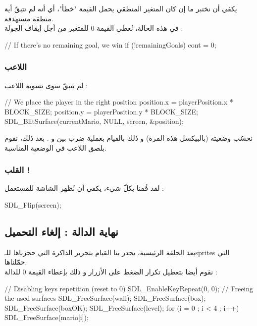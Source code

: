 يكفي أن نختبر ما إن كان المتغير المنطقي يحمل القيمة "خطأ"، أي أنه لم تتبقّ أية منطقة مستهدفة.\\
في هذه الحالة، نُعطي القيمة 0 للمتغير
من أجل إيقاف الجولة :

\begin{Csource}
// If there's no remaining goal, we win
if (!remainingGoals)
	cont = 0;
\end{Csource}

\subsubsection{اللاعب}

لم يتبقّ سوى تسوية اللاعب :

\begin{Csource}
// We place the player in the right position
position.x = playerPosition.x * BLOCK_SIZE;
position.y = playerPosition.y * BLOCK_SIZE;
SDL_BlitSurface(currentMario, NULL, screen, &position);
\end{Csource}

نحسُب وضعيته (بالبيكسل هذه المرة) و ذلك بالقيام بعملية ضرب بين
و
.
بعد ذلك، نقوم بلصق اللاعب في الوضعية المناسبة.

\subsubsection{القلب !}

لقد قُمنا بكلّ شيء، يكفي أن نُظهر الشاشة للمستعمل :

\begin{Csource}
SDL_Flip(screen);
\end{Csource}

\subsection{نهاية الدالة : إلغاء التحميل}

بعد الحلقة الرئيسية، يجدر بنا القيام بتحرير الذاكرة التي حجزناها للـ\textenglish{sprites}
التي حمّلناها.\\
نقوم أيضا بتعطيل تكرار الضغط على الأزرار و ذلك بإعطاء القيمة 0 للدالة
 :

\begin{Csource}
// Disabling keys repetition (reset to 0)
SDL_EnableKeyRepeat(0, 0);
// Freeing the used surfaces
SDL_FreeSurface(wall);
SDL_FreeSurface(box);
SDL_FreeSurface(boxOK);
SDL_FreeSurface(level);
for (i = 0 ; i < 4 ; i++)
	SDL_FreeSurface(mario[i]);
\end{Csource}

